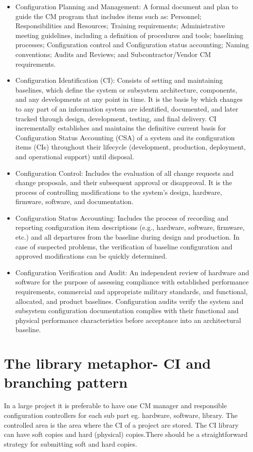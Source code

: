 \begin{itemize}
    \item Configuration Planning and Management:
    A formal document and plan to guide the CM program that includes items such as:
    Personnel; Responsibilities and Resources; Training requirements; Administrative meeting guidelines, including a definition of procedures and tools;
    baselining processes; Configuration control and Configuration status accounting; Naming conventions; Audits and Reviews; and Subcontractor/Vendor CM requirements.
    \item Configuration Identification (CI):
    Consists of setting and maintaining baselines, which define the system or subsystem architecture,
    components, and any developments at any point in time. It is the basis by which changes to any part of an information system are identified, documented,
    and later tracked through design, development, testing, and final delivery. CI incrementally establishes and maintains the definitive current basis for Configuration Status Accounting (CSA)
    of a system and its configuration items (CIs) throughout their lifecycle (development, production, deployment, and operational support) until disposal.
    \item Configuration Control:
    Includes the evaluation of all change requests and change proposals, and their subsequent approval or disapproval.
    It is the process of controlling modifications to the system's design, hardware, firmware, software, and documentation.
    \item Configuration Status Accounting:
    Includes the process of recording and reporting configuration item descriptions (e.g., hardware, software, firmware, etc.) and all departures
    from the baseline during design and production. In case of suspected problems, the verification of baseline configuration and approved modifications can be quickly determined.
    \item Configuration Verification and Audit:
    An independent review of hardware and software for the purpose of assessing compliance with established performance requirements,
    commercial and appropriate military standards, and functional, allocated, and product baselines. Configuration audits verify the system and subsystem configuration documentation
    complies with their functional and physical performance characteristics before acceptance into an architectural baseline.
\end{itemize}

\section{The library metaphor- CI and branching pattern}
In a large project it is preferable to have one CM manager and responsible configuration controllers for each sub part eg. hardware, software, library. The controlled area is the area
where the CI of a project are stored. The CI library can have soft copies and hard (physical) copies.There should be a straightforward strategy for submitting soft and hard copies.
